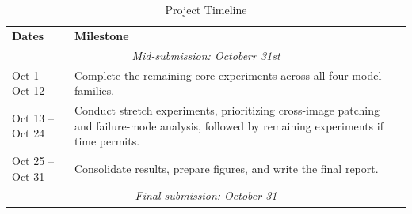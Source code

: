 \documentclass[11pt]{article}
\begin{document}
\begin{table}[ht]
\centering
\small
\begin{tabularx}{\columnwidth}{@{}l X@{}}
\toprule
\textbf{Dates} & \textbf{Milestone} \\ 




\multicolumn{2}{c}{\textit{Mid-submission: Octoberr 31st}} \\

\midrule

Oct 1 -- Oct 12 
& Complete the remaining core experiments across all four model families. \\ 
\addlinespace[0.5ex]

Oct 13 -- Oct 24 
& Conduct stretch experiments, prioritizing cross-image patching and failure-mode analysis, followed by remaining experiments if time permits. \\ 
\addlinespace[0.5ex]

Oct 25 -- Oct 31 
& Consolidate results, prepare figures, and write the final report. \\

\midrule
\multicolumn{2}{c}{\textit{Final submission: October 31}} \\

\bottomrule
\end{tabularx}
\caption{Project Timeline}
\label{tab:timeline}
\end{table}



\end{document}
